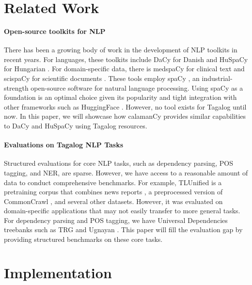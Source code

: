 \documentclass[11pt]{article}
\begin{document}



\section{Related Work}

\paragraph*{Open-source toolkits for NLP}
There has been a growing body of work in the development of NLP toolkits in recent years. 
For languages, these toolkits include DaCy for Danish \citep{Enevoldsen2021DaCyAU} and HuSpaCy for Hungarian \citep{Orosz2022HuSpaCyAI}.
For domain-specific data, there is medspaCy for clinical text \citep{Eyre2021LaunchingIC} and scispaCy for scientific documents \citep{Neumann2019ScispaCyFA}.
These tools employ spaCy \citep{Honnibal2020Spacy}, an industrial-strength open-source software for natural language processing.
Using spaCy as a foundation is an optimal choice given its popularity and tight integration with other frameworks such as HuggingFace \citep{Wolf2019HuggingFacesTS}.
However, no tool exists for Tagalog until now.
In this paper, we will showcase how calamanCy provides similar capabilities to DaCy and HuSpaCy using Tagalog resources.

\paragraph*{Evaluations on Tagalog NLP Tasks} 
Structured evaluations for core NLP tasks, such as dependency parsing, POS tagging, and NER, are sparse.
However, we have access to a reasonable amount of data to conduct comprehensive benchmarks.
For example, TLUnified \citep{Cruz2021ImprovingLL} is a pretraining corpus that combines news reports \citep{Cruz2020ExploitingNA}, a preprocessed version of CommonCrawl \citep{OrtizSuarez2019AsynchronousPF}, and several other datasets.
However, it was evaluated on domain-specific applications that may not easily transfer to more general tasks.
For dependency parsing and POS tagging, we have Universal Dependencies treebanks such as TRG \citep{Samson2018TRG} and Ugnayan \citep{Aquino2020ParsingIT}.
This paper will fill the evaluation gap by providing structured benchmarks on these core tasks.

\section{Implementation}
\end{document}
